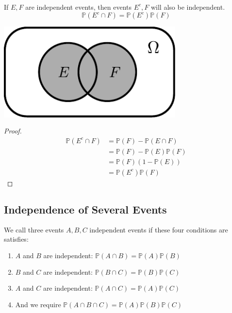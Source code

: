 \begin{proposition}~ 

    \begin{minipage}{0.7\textwidth}
        If \(E, F\) are independent events, then events \(E^c, F\) will also be independent. 
        \[
            \mathbb{P}(E^c \cap F) = \mathbb{P}(E^c)\mathbb{P}(F)
        \]
    \end{minipage}
    \begin{minipage}{0.3\textwidth}
        \centering
        \includegraphics[width=0.7\textwidth]{Figures/PropIndp.pdf}
    \end{minipage}
    
    \begin{proof}
        \[
            \begin{aligned}
                \mathbb{P}(E^c \cap F) &= \mathbb{P}(F) - \mathbb{P}(E \cap F) \\
                &= \mathbb{P}(F) - \mathbb{P}(E)\mathbb{P}(F) \\
                &= \mathbb{P}(F)(1 - \mathbb{P}(E)) \\
                &= \mathbb{P}(E^c)\mathbb{P}(F)
            \end{aligned}
        \]
    \end{proof}
\end{proposition}

\subsection{Independence of Several Events}
We call three events \(A, B, C\) independent events if these four conditions are satisfies:
\begin{enumerate}
    \item \(A\) and \(B\) are independent: \(\mathbb{P}(A \cap B) = \mathbb{P}(A)\mathbb{P}(B)\) 
    \item \(B\) and \(C\) are independent: \(\mathbb{P}(B \cap C) = \mathbb{P}(B)\mathbb{P}(C)\) 
    \item \(A\) and \(C\) are independent: \(\mathbb{P}(A \cap C) = \mathbb{P}(A)\mathbb{P}(C)\) 
    \item And we require \(\mathbb{P}(A \cap B \cap C) = \mathbb{P}(A)\mathbb{P}(B)\mathbb{P}(C)\) 
\end{enumerate}

